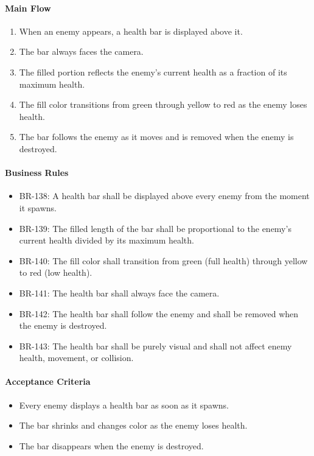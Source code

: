 \documentclass[11pt,a4paper]{article}
\begin{document}
\paragraph{Main Flow}
\begin{enumerate}
  \item When an enemy appears, a health bar is displayed above it.
  \item The bar always faces the camera.
  \item The filled portion reflects the enemy's current health as a fraction of
        its maximum health.
  \item The fill color transitions from green through yellow to red as the enemy
        loses health.
  \item The bar follows the enemy as it moves and is removed when the enemy is
        destroyed.
\end{enumerate}

\paragraph{Business Rules}
\begin{itemize}
  \item BR-138: A health bar shall be displayed above every enemy from the moment
        it spawns.
  \item BR-139: The filled length of the bar shall be proportional to the enemy's
        current health divided by its maximum health.
  \item BR-140: The fill color shall transition from green (full health) through
        yellow to red (low health).
  \item BR-141: The health bar shall always face the camera.
  \item BR-142: The health bar shall follow the enemy and shall be removed when
        the enemy is destroyed.
  \item BR-143: The health bar shall be purely visual and shall not affect enemy
        health, movement, or collision.
\end{itemize}

\paragraph{Acceptance Criteria}
\begin{itemize}
  \item Every enemy displays a health bar as soon as it spawns.
  \item The bar shrinks and changes color as the enemy loses health.
  \item The bar disappears when the enemy is destroyed.
\end{itemize}
\end{document}
